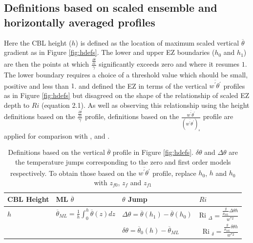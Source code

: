 \subsection{Definitions based on scaled ensemble and horizontally averaged profiles}

Here the CBL height ($h$) is defined as the location of maximum scaled vertical $\overline{\theta}$ gradient as in Figure \ref{fig:hdefs}.  The lower and upper EZ boundaries ($h_{0}$ and $h_{1}$) are then the points at which $\frac{\frac{\partial \overline{\theta}}{\partial z}}{\gamma}$ significantly exceeds zero and where it resumes $1$.  The lower boundary requires a choice of a threshold value which should be small, positive and less than $1$. \cite{FedConzMir04} and \cite{BrooksFowler2} defined the EZ in terms of the vertical $\overline{w^{'}\theta^{'}}$ profiles as in Figure \ref{fig:hdefs} but disagreed on the shape of the relationship of scaled EZ depth to $Ri$ (equation 2.1).  As well as observing this relationship using the height definitions based on the $\frac{\frac{\partial \overline{\theta}}{\partial z}}{\gamma}$ profile, definitions based on the $\frac{\overline{w^{'}\theta^{'}}}{(\overline{w^{'}\theta^{'}})_{s}}$ profile are applied for comparison with \cite{BrooksFowler2}, \cite{FedConzMir04} and \cite{GarciaMellado}.\\  

\begin{table}[htbp]
\caption[Height definitions]{Definitions based on the vertical $\overline{\theta}$ profile in Figure \ref{fig:hdefs}. $\delta \theta$ and $\Delta \theta$ are the temperature jumps corresponding to the zero and first order models respectively. To obtain those based on the $\overline{w^{'}\theta^{'}}$ profile, replace $h_{0}$, $h$ and $h_{0}$ with $z_{f0}$, $z_{f}$ and $z_{f1}$}


    \begin{tabular}{p{} p{} p{3cm} p{2.5cm}}
    
      CBL Height & ML $\overline{\theta}$ & $\theta$ Jump &$     Ri $\\ \hline 
       $h$ & $\overline{\theta}_{ML} = \frac{1}{h}\int^{h}_{0}\overline{\theta}(z)dz$ & $\Delta \theta=\overline{\theta}(h_{1})-\overline{\theta}(h_{0})$ &      Ri $_{\Delta}=\frac{\frac{g}{\overline{\theta}_{ML}}\Delta \theta h}{w^{*2}}$  \\ [.3cm] 
        
       & &$\delta \theta = \overline{\theta}_{0}(h)- \overline{\theta}_{ML}$ & \    Ri $_{\delta}=\frac{\frac{g}{\overline{\theta}_{ML}} \delta \theta h}{w^{*2}}$ \\ \hline
      \end{tabular}

\label{tab:reldefs}   
    
\end{table}


